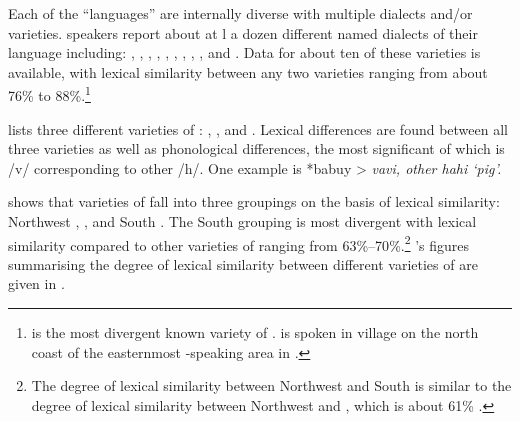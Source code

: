
Each of the  “languages” are internally diverse
with multiple dialects and/or varieties.
 speakers report about at l a dozen different named
dialects of their language including: ,
, , , ,
, , , , and .
Data for about ten of these varieties is available,
with lexical similarity between any two varieties ranging from
about 76{\%} to 88{\%}.\footnote{
		  is
		the most divergent known variety of .
		  is spoken in  village on the north coast
		of the easternmost -speaking area in .}

\citet[i]{LSG2006} lists three different varieties of :
 ,  , and  .
Lexical differences are found between all three varieties as
well as phonological differences,
the most significant of which is   /v/ corresponding
to other  /h/.
One example is *babuy >   \it{vavi}, other  \it{hahi} ‘pig’.

\citet{Fogaca2017} shows that varieties of  fall
into three groupings on the basis of lexical similarity: Northwest
,  , and South .
The South  grouping is most divergent with lexical similarity
compared to other varieties of  ranging from 63{\%}--70{\%}.\footnote{
		The degree of lexical similarity between Northwest 
		and South  is similar to the degree of lexical similarity
		between Northwest  and , which is about 61{\%} \citep[35]{Edwards2019}.}
\citeauthor{Fogaca2017}’s figures summarising the degree of lexical similarity
between different varieties of  are given in .


